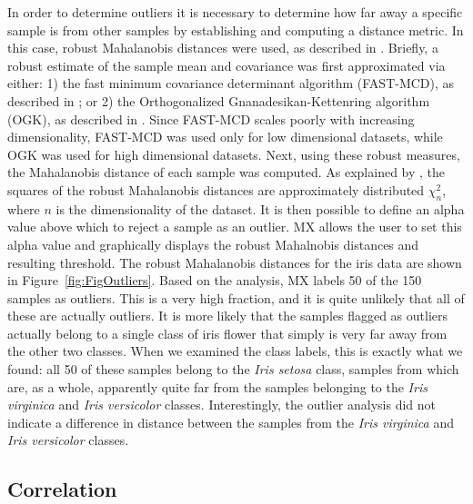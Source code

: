 \documentclass{article}
\begin{document}
In order to determine outliers it is necessary to determine how far away a specific sample is from other samples by establishing and computing a distance metric. In this case, robust Mahalanobis distances were used, as described in \cite{hubert2008high}. Briefly, a robust estimate of the sample mean and covariance was first approximated via either: 1) the fast minimum covariance determinant algorithm (FAST-MCD), as described in \cite{rousseeuw1999fast}; or 2) the Orthogonalized Gnanadesikan-Kettenring algorithm (OGK), as described in \cite{maronna2002robust}. Since FAST-MCD scales poorly with increasing dimensionality, FAST-MCD was used only for low dimensional datasets, while OGK was used for high dimensional datasets. Next, using these robust measures, the Mahalanobis distance of each sample was computed. As explained by \cite{hardin2012distribution}, the squares of the robust Mahalanobis distances are approximately distributed $\chi^2_n$, where $n$ is the dimensionality of the dataset. It is then possible to define an alpha value above which to reject a sample as an outlier. MX allows the user to set this alpha value and graphically displays the robust Mahalnobis distances and resulting threshold. The robust Mahalanobis distances for the iris data are shown in Figure~\ref{fig:FigOutliers}. Based on the analysis, MX labels 50 of the 150 samples as outliers. This is a very high fraction, and it is quite unlikely that all of these are actually outliers. It is more likely that the samples flagged as outliers actually belong to a single class of iris flower that simply is very far away from the other two classes. When we examined the class labels, this is exactly what we found: all 50 of these samples belong to the \textit{Iris setosa} class, samples from which are, as a whole, apparently quite far from the samples belonging to the \textit{Iris virginica} and \textit{Iris versicolor} classes. Interestingly, the outlier analysis did not indicate a difference in distance between the samples from the \textit{Iris virginica} and \textit{Iris versicolor} classes. 

\subsection{Correlation}
\label{subsec:SubSecCorrelation}
\end{document}
